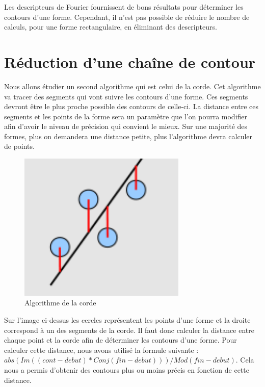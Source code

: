 \documentclass[11pt]{article}
\begin{document}
  Les descripteurs de Fourier fournissent de bons résultats pour déterminer les contours d'une forme. 
  Cependant, il n'est pas possible de réduire le nombre de calculs, pour une forme rectangulaire, 
  en éliminant des descripteurs.

  \section{Réduction d'une chaîne de contour}
  Nous allons étudier un second algorithme qui est celui de la corde.
  Cet algorithme va tracer des segments qui vont suivre les contours d'une forme. Ces segments 
  devront être le plus proche possible des contours de celle-ci. La distance entre ces segments 
  et les points de la forme sera un paramètre que l'on pourra modifier afin d'avoir le niveau de 
  précision qui convient le mieux. Sur une majorité des formes, plus on demandera une distance petite, 
  plus l'algorithme devra calculer de points.\\ 
  
  
  \begin{figure}[!h]
    \begin{center}
      \includegraphics[width=8cm]{corde.png}
    \end{center}
    \caption{Algorithme de la corde}
  \end{figure}
  
  
  Sur l'image ci-dessus les cercles représentent les points d'une forme et la droite correspond
  à un des segments de la corde. Il faut donc calculer la distance entre chaque point et la corde
  afin de déterminer les contours d'une forme.
  Pour calculer cette distance, nous avons utilisé la formule suivante :
  $abs(Im((cont - debut) * Conj(fin - debut))) / Mod(fin - debut)$.
  Cela nous a permis d'obtenir des contours plus ou moins précis en fonction de cette distance.\\
  
\end{document}
